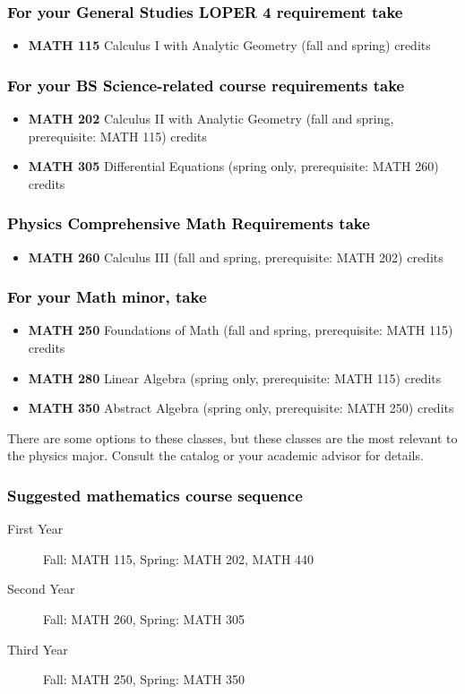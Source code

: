 \documentclass[10pt]{article}
\newcommand{\calcone}{\textbf{MATH 115} Calculus I with Analytic Geometry (fall and spring) \dotfill 5 credits}
\newcommand{\calctwo}{\textbf{MATH 202} Calculus II with Analytic Geometry (fall and spring, prerequisite: MATH 115) \dotfill 5 credits }
\newcommand{\foundations}{\textbf{MATH 250} Foundations of Math (fall and spring, prerequisite: MATH 115)  \dotfill 3 credits}
\newcommand{\calcthree}{\textbf{MATH 260} Calculus III  (fall and spring, prerequisite: MATH 202) \dotfill 5 credits}
\newcommand{\linear}{\textbf{MATH 280} Linear Algebra (spring only, prerequisite: MATH 115) \dotfill 3 credits}
\newcommand{\diffeq}{\textbf{MATH 305}	Differential Equations (spring only, prerequisite: MATH 260) \dotfill 	3 credits}
\newcommand{\abstractalgebra}{\textbf{MATH 350}	Abstract Algebra (spring only, prerequisite: MATH 250) \dotfill 	3 credits}
\begin{document}
\subsubsection*{\textcolor{black}{For your General Studies LOPER 4 requirement take}}
\begin{itemize}
\item \calcone
\end{itemize}

\subsubsection*{\textcolor{black}{For your BS Science-related course requirements take}}
\begin{itemize}
\item \calctwo
\item \diffeq
\end{itemize}


\subsubsection*{\textcolor{black}{Physics Comprehensive Math Requirements take}}
\begin{itemize}
 \item \calcthree
\end{itemize}

\subsubsection*{\textcolor{black}{For your Math minor, take}}
\begin{itemize}
\item \foundations
\item \linear
\item \abstractalgebra
\end{itemize}
There are some options to these classes, but these classes are the most relevant to the physics major. Consult the catalog or your academic
advisor for details.

\subsubsection*{\textcolor{black}{Suggested mathematics course sequence}}

\begin{description}
   \item[\phantom{xxx} First Year] Fall: MATH 115, Spring:  MATH 202, MATH 440
      \item[\phantom{xxx} Second Year]  Fall: MATH 260,  Spring: MATH 305
     \item[\phantom{xxx} Third Year]  Fall: MATH 250,  Spring: MATH 350
  \end{description}
  \vspace{0.1in}
  
\end{document}
